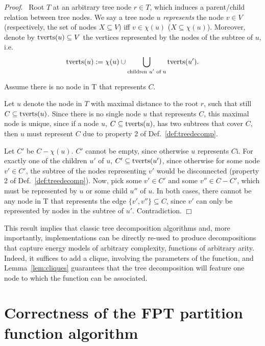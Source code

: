 \documentclass[10pt]{article}
\newenvironment{proof}[1][]{\noindent \emph{Proof}\ifthenelse{\equal{#1}{}}{}{ (#1)}.~}{\hfill$\Box$}
\begin{document}
\begin{proof}
  \newcommand{\TransVars}[1]{{\rm tverts}(#1)}%
  Root $T$ at an arbitrary tree node $r\in T$, which induces a parent/child relation between tree nodes.
  We say a tree node $u$ \emph{represents} the node $v\in V$ (respectively, the set of nodes $X\subseteq V$) iff $v\in\chi(u)$ ($X\subseteq\chi(u)$).
  Moreover, denote by $\TransVars{u}\subseteq V$ the vertices
  represented by the nodes of the subtree of $u$, i.e.
  $$\TransVars{u} := \chi(u) \cup \bigcup_{\text{children $u'$ of u}} \TransVars{u'}.$$

  Assume there is no node in T that represents $C$.

  Let $u$ denote the node in $T$ with maximal distance to the root $r$,
  such that still $C\subseteq\TransVars{u}$.
  Since there is no single node $u$ that represents $C$, this maximal node is unique, since
  if a node $u$, $C\subseteq\TransVars{u}$, has two subtrees that cover $C$, then $u$ must represent $C$ due to property 2 of Def.~\ref{def:treedecomp}. 

  Let $C'$ be $C-\chi(u)$.
  $C'$ cannot be empty, since otherwise $u$ represents $C$i.
  For exactly one of the children $u'$ of $u$,
  $C'\subseteq\TransVars{u'}$, since otherwise for
  some node $v'\in C'$, the subtree of the nodes representing $v'$ would be disconnected (property 2 of Def.~\ref{def:treedecomp}). Now, pick some $v'\in C'$ and some
  $v''\in C-C'$, which must be represented by $u$ or some child $u''$ of $u$. In both cases, there cannot
  be any node in T that represents the edge $\{v',v''\}\subseteq C$, since $v'$ can only be represented 
  by nodes in the subtree of $u'$. Contradiction.
\end{proof}


This result implies that classic tree decomposition algorithms and, more importantly, implementations can be directly re-used to produce decompositions that capture energy models of arbitrary complexity, functions of arbitrary arity. Indeed, it suffices to add a clique, involving the parameters of the function, and Lemma~\ref{lem:cliques} guarantees that the tree decomposition will feature one node to which the function can be associated.


    \section{Correctness of the FPT partition function algorithm}
    \label{appsec:correctness}
\end{document}
